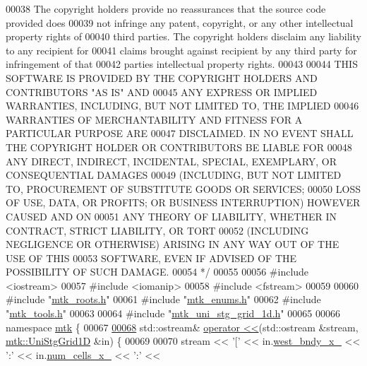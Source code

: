 \begin{DoxyCode}
00038 \textcolor{comment}{The copyright holders provide no reassurances that the source code provided does}
00039 \textcolor{comment}{not infringe any patent, copyright, or any other intellectual property rights of}
00040 \textcolor{comment}{third parties. The copyright holders disclaim any liability to any recipient for}
00041 \textcolor{comment}{claims brought against recipient by any third party for infringement of that}
00042 \textcolor{comment}{parties intellectual property rights.}
00043 \textcolor{comment}{}
00044 \textcolor{comment}{THIS SOFTWARE IS PROVIDED BY THE COPYRIGHT HOLDERS AND CONTRIBUTORS "AS IS" AND}
00045 \textcolor{comment}{ANY EXPRESS OR IMPLIED WARRANTIES, INCLUDING, BUT NOT LIMITED TO, THE IMPLIED}
00046 \textcolor{comment}{WARRANTIES OF MERCHANTABILITY AND FITNESS FOR A PARTICULAR PURPOSE ARE}
00047 \textcolor{comment}{DISCLAIMED. IN NO EVENT SHALL THE COPYRIGHT HOLDER OR CONTRIBUTORS BE LIABLE FOR}
00048 \textcolor{comment}{ANY DIRECT, INDIRECT, INCIDENTAL, SPECIAL, EXEMPLARY, OR CONSEQUENTIAL DAMAGES}
00049 \textcolor{comment}{(INCLUDING, BUT NOT LIMITED TO, PROCUREMENT OF SUBSTITUTE GOODS OR SERVICES;}
00050 \textcolor{comment}{LOSS OF USE, DATA, OR PROFITS; OR BUSINESS INTERRUPTION) HOWEVER CAUSED AND ON}
00051 \textcolor{comment}{ANY THEORY OF LIABILITY, WHETHER IN CONTRACT, STRICT LIABILITY, OR TORT}
00052 \textcolor{comment}{(INCLUDING NEGLIGENCE OR OTHERWISE) ARISING IN ANY WAY OUT OF THE USE OF THIS}
00053 \textcolor{comment}{SOFTWARE, EVEN IF ADVISED OF THE POSSIBILITY OF SUCH DAMAGE.}
00054 \textcolor{comment}{*/}
00055 
00056 \textcolor{preprocessor}{#include <iostream>}
00057 \textcolor{preprocessor}{#include <iomanip>}
00058 \textcolor{preprocessor}{#include <fstream>}
00059 
00060 \textcolor{preprocessor}{#include "\hyperlink{mtk__roots_8h}{mtk\_roots.h}"}
00061 \textcolor{preprocessor}{#include "\hyperlink{mtk__enums_8h}{mtk\_enums.h}"}
00062 \textcolor{preprocessor}{#include "\hyperlink{mtk__tools_8h}{mtk\_tools.h}"}
00063 
00064 \textcolor{preprocessor}{#include "\hyperlink{mtk__uni__stg__grid__1d_8h}{mtk\_uni\_stg\_grid\_1d.h}"}
00065 
00066 \textcolor{keyword}{namespace }\hyperlink{namespacemtk}{mtk} \{
00067 
\hypertarget{mtk__uni__stg__grid__1d_8cc_source_l00068}{}\hyperlink{namespacemtk_a97f79d150b3b5c7b76d4fcc2271f972b}{00068} std::ostream& \hyperlink{namespacemtk_ad3bcf52cda59ddb5fc7b4bdce76c46dc}{operator <<}(std::ostream &stream, \hyperlink{classmtk_1_1UniStgGrid1D}{mtk::UniStgGrid1D} &in) \{
00069 
00070   stream << \textcolor{charliteral}{'['} << in.\hyperlink{classmtk_1_1UniStgGrid1D_a6910438d3396d0b9a130d11d16979c46}{west\_bndy\_x\_} << \textcolor{charliteral}{':'} << in.\hyperlink{classmtk_1_1UniStgGrid1D_afa43750db0029b7454aef343759e7097}{num\_cells\_x\_} << \textcolor{charliteral}{':'} <<

\end{DoxyCode}
